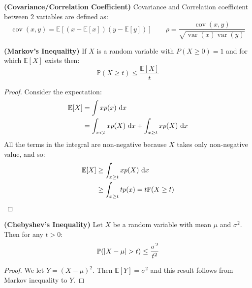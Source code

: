 \begin{definition}{\textbf{(Covariance/Correlation Coefficient)}}
    Covariance and Correlation coefficient between $2$ variables are defined as:
    \begin{equation*}
        \operatorname{cov}(x, y) = \mathbb{E}[(x - \mathbb{E}[x])(y - \mathbb{E}[y])] \qquad \rho = \frac{\operatorname{cov}(x, y)}{\sqrt{\operatorname{var}(x)\operatorname{var}(y)}}
    \end{equation*}
\end{definition}

\begin{theorem}{\textbf{(Markov's Inequality)}}
    If $X$ is a random variable with $P(X\ge0) = 1$ and for which $\mathbb{E}[X]$ exists then:
    \begin{equation*}
        \mathbb{P}(X\ge t) \le \frac{\mathbb{E}[X]}{t}
    \end{equation*}
\end{theorem}
\begin{proof}
    Consider the expectation:
    \begin{equation*}
    \begin{aligned}
        \mathbb{E}[X] &= \int x p(x)\ \mathrm{d} x \\
        &= \int_{x < t} xp(X)\ \mathrm{d} x + \int_{x \ge t} xp(X)\ \mathrm{d} x 
    \end{aligned}
    \end{equation*}
    All the terms in the integral are non-negative because $X$ takes only non-negative value, and so:
    \begin{equation*}
    \begin{aligned}
        \mathbb{E}[X] &\ge \int_{x \ge t} xp(X)\ \mathrm{d} x \\
        &\ge \int_{x\ge t} tp(x) = t \mathbb{P}(X\ge t)
    \end{aligned}
    \end{equation*}
\end{proof}

\begin{theorem}{\textbf{(Chebyshev's Inequality)}}
    Let $X$ be a random variable with mean $\mu$ and $\sigma^2$. Then for any $t>0$:
    \begin{equation*}
        \mathbb{P}(\left| X - \mu \right| > t) \le \frac{\sigma^2}{t^2}
    \end{equation*}
\end{theorem}
\begin{proof}
    We let $Y = (X - \mu)^2$. Then $\mathbb{E}[Y] = \sigma^2$ and this result follows from Markov inequality to $Y$.
\end{proof}

